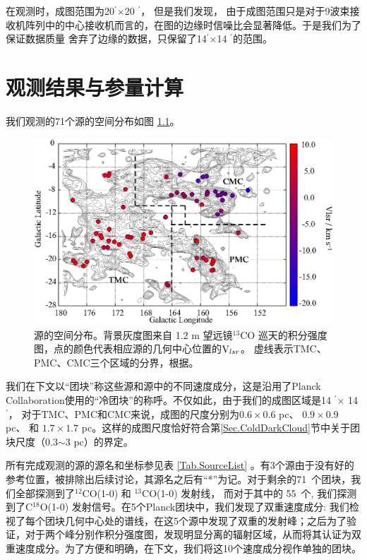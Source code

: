 \documentclass[UTF8, nocolorlinks]{pkuthss}
\newcommand{\cob}{$^{13}$CO }
\newcommand{\coaa}{$^{12}$CO(1-0) }
\newcommand{\cobb}{$^{13}$CO(1-0) }
\newcommand{\cocc}{C$^{18}$O(1-0) }
\newcommand{\multi}{$\times$}
\newcommand{\vlsr}{${\rm V } _{lsr}$}
\newcommand{\arcmin}{$^{\prime}$}
\newcommand{\numsou}{71\ }
\newcommand{\numcocc}{55\ }
\begin{document}
        在观测时，成图范围为20\arcmin \multi 20 \arcmin ， 但是我们发现， 由于成图范围只是对于9波束接收机阵列中的中心接收机而言的，在图的边缘时信噪比会显著降低。于是我们为了保证数据质量 舍弃了边缘的数据，只保留了14\arcmin \multi 14 \arcmin 的范围。
\chapter{观测结果与参量计算}
	
	我们观测的71个源的空间分布如图 \ref{Fig.SpatialDistribution}。

	\begin{figure}[H]
	\centering
	\includegraphics[totalheight=72mm]{SpatiaDist_Velocity_Overlay.eps}
	\caption{\small 源的空间分布。背景灰度图来自 1.2 m 望远镜\cob 巡天的积分强度图\supercite{2001ApJ...547..792D}，点的颜色代表相应源的几何中心位置的\vlsr 。
	虚线表示TMC、PMC、CMC三个区域的分界，根据\parencite{2010A&A...512A..67L}。
	\label{Fig.SpatialDistribution}}
	\end{figure}

	我们在下文以“团块”称这些源和源中的不同速度成分，这是沿用了Planck Collaboration使用的“冷团块”的称呼\supercite{2011A&A...536A..23P}。不仅如此，由于我们的成图区域是14 \arcmin $\times$ 14 \arcmin ， 对于TMC、PMC和CMC来说，成图的尺度分别为$0.6\times0.6$ pc、 $0.9\times0.9$ pc、 和 $1.7\times1.7$ pc。这样的成图尺度恰好符合第\ref{Sec.ColdDarkCloud}节中关于团块尺度（0.3$\sim$3 pc）的界定。

	所有完成观测的源的源名和坐标参见表 \ref{Tab.SourceList} 。有3个源由于没有好的参考位置，被排除出后续讨论，其源名之后有“*”为记。对于剩余的\numsou 个团块，我们全部探测到了\coaa  和 \cobb 发射线， 而对于其中的 \numcocc 个, 我们探测到了\cocc 发射信号。在5个Planck团块中，我们发现了双重速度成分: 我们检视了每个团块几何中心处的谱线，在这5个源中发现了双重的发射峰；之后为了验证，对于两个峰分别作积分强度图，发现明显分离的辐射区域，从而将其认证为双重速度成分。为了方便和明确，在下文，我们将这10个速度成分视作单独的团块。
	
\end{document}
